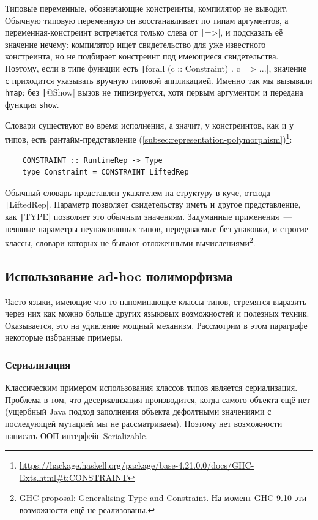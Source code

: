 Типовые переменные, обозначающие констреинты, компилятор не выводит.
Обычную типовую переменную он восстанавливает по типам аргументов, а переменная-констреинт встречается только слева от \texttt|=>|, и подсказать её значение нечему: компилятор ищет свидетельство для уже известного констреинта, но не подбирает констреинт под имеющиеся свидетельства.
Поэтому, если в типе функции есть \texttt|forall (c :: Constraint) . c => ...|, значение \texttt{c} приходится указывать вручную типовой аппликацией.
Именно так мы вызывали \texttt{hmap}: без \texttt|@Show| вызов не типизируется, хотя первым аргументом и передана функция \texttt{show}.

Словари существуют во время исполнения, а значит, у констреинтов, как и у типов, есть рантайм-представление (\ref{subsec:representation-polymorphism})\footnote{\url{https://hackage.haskell.org/package/base-4.21.0.0/docs/GHC-Exts.html\#t:CONSTRAINT}}:
\begin{verbatim}
    CONSTRAINT :: RuntimeRep -> Type
    type Constraint = CONSTRAINT LiftedRep
\end{verbatim}
Обычный словарь представлен указателем на структуру в куче, отсюда \texttt|LiftedRep|.
Параметр позволяет свидетельству иметь и другое представление, как \texttt|TYPE| позволяет это обычным значениям.
Задуманные применения~--- неявные параметры неупакованных типов, передаваемые без упаковки, и строгие классы, словари которых не бывают отложенными вычислениями\footnote{\href{https://ghc-proposals.readthedocs.io/en/latest/proposals/0518-type-vs-constraint.html}{GHC proposal: Generalising Type and Constraint}. На момент GHC 9.10 эти возможности ещё не реализованы.}.

\subsection{Использование ad-hoc полиморфизма}

Часто языки, имеющие что-то напоминающее классы типов, стремятся выразить через них как можно больше других языковых возможностей и полезных техник.
Оказывается, это на удивление мощный механизм.
Рассмотрим в этом параграфе некоторые избранные примеры.

\subsubsection{Сериализация}

Классическим примером использования классов типов является сериализация.
Проблема в том, что десериализация производится, когда самого объекта ещё нет (ущербный Java подход заполнения объекта дефолтными значениями с последующей мутацией мы не рассматриваем).
Поэтому нет возможности написать ООП интерфейс Serializable.

